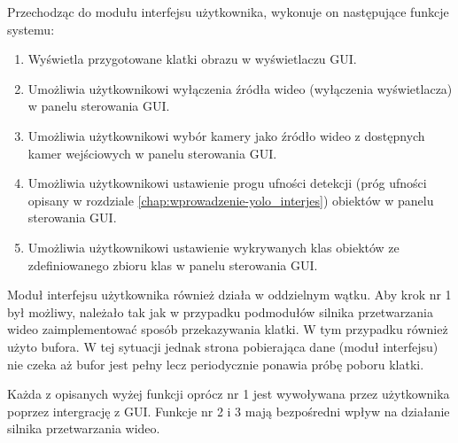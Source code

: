 Przechodząc do modułu interfejsu użytkownika, wykonuje on następujące funkcje systemu:
\begin{enumerate}
    \item Wyświetla przygotowane klatki obrazu w wyświetlaczu GUI.
    \item Umożliwia użytkownikowi wyłączenia źródła wideo (wyłączenia wyświetlacza) w panelu sterowania GUI.
    \item Umożliwia użytkownikowi wybór kamery jako źródło wideo z dostępnych kamer wejściowych w panelu sterowania GUI.
    \item Umożliwia użytkownikowi ustawienie progu ufności detekcji (próg ufności opisany w rozdziale \ref{chap:wprowadzenie-yolo_interjes}) obiektów w panelu sterowania GUI.
    \item Umożliwia użytkownikowi ustawienie wykrywanych klas obiektów ze zdefiniowanego zbioru klas w panelu sterowania GUI.
\end{enumerate}
Moduł interfejsu użytkownika również działa w oddzielnym wątku. Aby krok nr 1 był możliwy, należało tak jak w przypadku podmodułów silnika przetwarzania wideo zaimplementować sposób przekazywania klatki. W tym przypadku również użyto bufora. W tej sytuacji jednak strona pobierająca dane (moduł interfejsu) nie czeka aż bufor jest pełny lecz periodycznie ponawia próbę poboru klatki. 

Każda z opisanych wyżej funkcji oprócz nr 1 jest wywoływana przez użytkownika poprzez intergrację z GUI. Funkcje nr 2 i 3 mają bezpośredni wpływ na działanie silnika przetwarzania wideo.